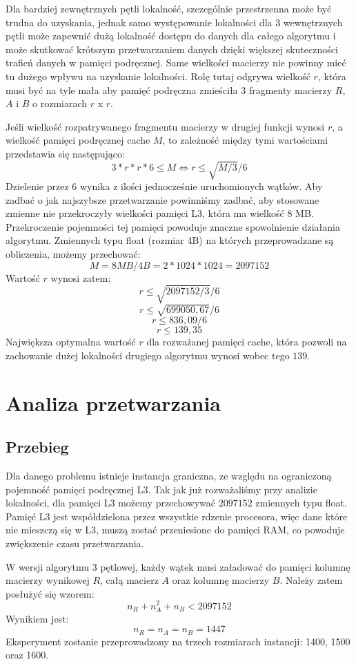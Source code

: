 \documentclass{article}
\begin{document}
Dla bardziej zewnętrznych pętli lokalność, szczególnie przestrzenna może być trudna do uzyskania, jednak samo występowanie lokalności dla 3 wewnętrznych pętli może zapewnić dużą lokalność dostępu do danych dla całego algorytmu i może skutkować krótszym przetwarzaniem danych dzięki większej skuteczności trafień danych w pamięci podręcznej. Same wielkości macierzy nie powinny mieć tu dużego wpływu na uzyskanie lokalności. Rolę tutaj odgrywa wielkość $r$, która musi być na tyle mała aby pamięć podręczna zmieściła 3 fragmenty macierzy $R$, $A$ i $B$ o rozmiarach $r$ x $r$.

Jeśli wielkość rozpatrywanego fragmentu macierzy w drugiej funkcji wynosi $r$, a wielkość pamięci podręcznej cache $M$, to zależność między tymi wartościami przedstawia się następująco:
\[ 3*r*r*6 \leq M \Longleftrightarrow r \leq \sqrt{M/3}/6\]
Dzielenie przez 6 wynika z ilości jednocześnie uruchomionych wątków. Aby zadbać o jak najszybsze przetwarzanie powinniśmy zadbać, aby stosowane zmienne nie przekroczyły wielkości pamięci L3, która ma wielkość 8 MB. Przekroczenie pojemności tej pamięci powoduje znaczne spowolnienie działania algorytmu. Zmiennych typu float (rozmiar 4B) na których przeprowadzane są obliczenia, możemy przechować: 
\[ M = 8MB/4B = 2 * 1024 * 1024 = 2097152 \]
Wartość $r$ wynosi zatem:
\[ r \leq \sqrt{2097152 / 3}/6 \]
\[ r \leq \sqrt{699050,67}/6 \]
\[ r \leq 836,09/6 \]
\[ r \leq 139,35 \]
Największa optymalna wartość $r$ dla rozważanej pamięci cache, która pozwoli na zachowanie dużej lokalności drugiego algorytmu wynosi wobec tego $139$.

\section{Analiza przetwarzania}
\subsection{Przebieg}

Dla danego problemu istnieje instancja graniczna, ze względu na ograniczoną pojemność pamięci podręcznej L3. Tak jak już rozważaliśmy przy analizie lokalności, dla pamięci L3 możemy przechowywać $2097152$ zmiennych typu float. Pamięć L3 jest współdzielona przez wszystkie rdzenie procesora, więc dane które nie mieszczą się w L3, muszą zostać przeniesione do pamięci RAM, co powoduje zwiększenie czasu przetwarzania.

W wersji algorytmu 3 pętlowej, każdy wątek musi załadować do pamięci kolumnę macierzy wynikowej $R$, całą macierz $A$ oraz kolumnę macierzy $B$.
Należy zatem posłużyć się wzorem:
\[ n_R + n_A^2 + n_B < 2097152 \]
Wynikiem jest:
\[ n_R = n_A = n_B = 1447\]
Eksperyment zostanie przeprowadzony na trzech rozmiarach instancji: 1400, 1500 oraz 1600.
\end{document}
